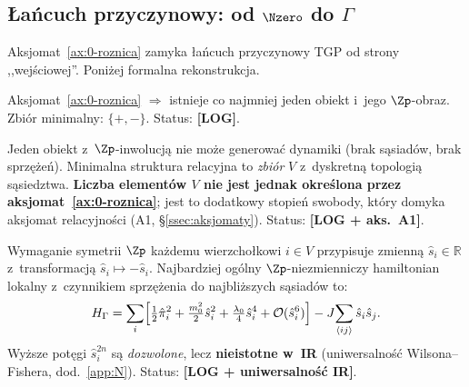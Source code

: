\subsection{\L{}a\'ncuch przyczynowy: od $\Nzero$ do $\Gamma$}%
\label{app:0-lancuch}

Aksjomat~\ref{ax:0-roznica} zamyka \l{}a\'ncuch przyczynowy TGP
od strony ,,wej\'sciowej''. Poni\.zej formalna rekonstrukcja.

\begin{chain}%
\label{chain:0-krok1}
Aksjomat~\ref{ax:0-roznica} $\Rightarrow$
istnieje co najmniej jeden obiekt i~jego $\Zp$-obraz.
Zbi\'or minimalny: $\{+, -\}$. Status: \textbf{[LOG]}.
\end{chain}

\begin{chain}%
\label{chain:0-krok2}
Jeden obiekt z~$\Zp$-inwolucj\k{a} nie mo\.ze generowa\'c dynamiki
(brak s\k{a}siad\'ow, brak sprz\k{e}\.ze\'n). Minimalna struktura
relacyjna to \emph{zbi\'or} $V$ z~dyskretn\k{a} topologi\k{a}
s\k{a}siedztwa. \textbf{Liczba element\'ow $V$ nie jest jednak
okre\'slona przez aksjomat~\ref{ax:0-roznica}}; jest to dodatkowy
stopień swobody, kt\'ory domyka aksjomat relacyjno\'sci
(A1, \S\ref{ssec:aksjomaty}). Status: \textbf{[LOG + aks.~A1]}.
\end{chain}

\begin{chain}%
\label{chain:0-krok3}
Wymaganie symetrii $\Zp$ ka\.zdemu wierzcho\l{}kowi $i \in V$ przypisuje
zmienn\k{a} $\hat{s}_i \in \mathbb{R}$ z~transformacj\k{a}
$\hat{s}_i \mapsto -\hat{s}_i$.
Najbardziej og\'olny $\Zp$-niezmienniczy hamiltonian lokalny z~czynnikiem
sprz\k{e}\.zenia do najbli\.zszych s\k{a}siad\'ow to:
\begin{equation}\label{eq:0-H-general}
  H_\Gamma = \sum_i \Bigl[
    \tfrac{1}{2}\hat{\pi}_i^2
    + \tfrac{m_0^2}{2}\hat{s}_i^2
    + \tfrac{\lambda_0}{4}\hat{s}_i^4
    + \mathcal{O}(\hat{s}_i^6)
  \Bigr]
  - J\!\sum_{\langle ij\rangle} \hat{s}_i\hat{s}_j.
\end{equation}
Wy\.zsze pot\k{e}gi $\hat{s}_i^{2n}$ s\k{a} \emph{dozwolone}, lecz
\textbf{nieistotne w~IR} (uniwersalno\'s\'c Wilsona--Fishera,
dod.~\ref{app:N}). Status: \textbf{[LOG + uniwersalno\'s\'c IR]}.
\end{chain}

